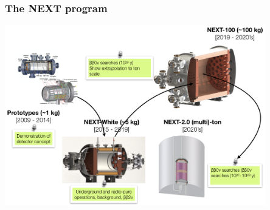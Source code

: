 \begin{frame}
\frametitle{The NEXT program} 
 \begin{center}
\includegraphics[width=0.85\textwidth]{moriond/next-program.png}
\end{center}
\end{frame}




